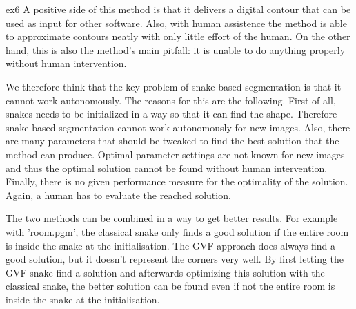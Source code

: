 ex6
A positive side of this method is that it delivers a digital contour that can be used as input for other software. Also, with human assistence the method is able to approximate contours neatly with only little effort of the human. On the other hand, this is also the method's main pitfall: it is unable to do anything properly without human intervention.

We therefore think that the key problem of snake-based segmentation is that it cannot work autonomously. The reasons for this are the following.
First of all, snakes needs to be initialized in a way so that it can find the shape. Therefore snake-based segmentation cannot work autonomously for new images. 
Also, there are many parameters that should be tweaked to find the best solution that the method can produce. Optimal parameter settings are not known for new images and thus the optimal solution cannot be found without human intervention.
Finally, there is no given performance measure for the optimality of the solution. Again, a human has to evaluate the reached solution.

The two methods can be combined in a way to get better results. For example with 'room.pgm', the classical snake only finds a good solution if the entire room is inside the snake at the initialisation. The GVF approach does always find a good solution, but it doesn't represent the corners very well. By first letting the GVF snake find a solution and afterwards optimizing this solution with the classical snake, the better solution can be found even if not the entire room is inside the snake at the initialisation.